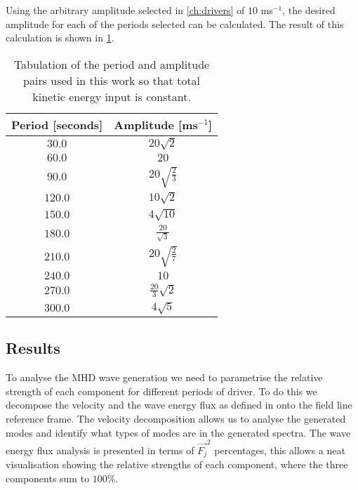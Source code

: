 Using the arbitrary amplitude selected in \cref{ch:drivers} of $10$ ms$^{-1}$, the desired amplitude for each of the periods selected can be calculated.
The result of this calculation is shown in \cref{tab:period-amp}.
\begin{table}
    \centering
    \begin{tabular}{cc}
        Period [seconds] & Amplitude [ms$^{-1}$] 	\\ \hline
        $30.0$           & $20\sqrt{2}$           	\\[2ex]
        $60.0$           & $20$  		            \\[2ex]
        $90.0$           & $20\sqrt{\frac{2}{3}}$  \\[2ex]
        $120.0$          & $10\sqrt{2}$        	\\[2ex]
        $150.0$          & $4\sqrt{10}$            \\[2ex]
        $180.0$          & $\frac{20}{\sqrt{3}}$   \\[2ex]
        $210.0$          & $20\sqrt{\frac{2}{7}}$  \\[2ex]
        $240.0$          & $10$                 	\\[2ex]
        $270.0$          & $\frac{20}{3}\sqrt{2}$  \\[2ex]
        $300.0$          & $4\sqrt{5}$           	\\[2ex]
    \end{tabular}
    \caption{Tabulation of the period and amplitude pairs used in this work so that total kinetic energy input is constant.}
    \label{tab:period-amp}
\end{table}

\subsection{Results}\label{subsec:results}

To analyse the MHD wave generation we need to parametrise the relative strength of each component for different periods of driver.
To do this we decompose the velocity and the wave energy flux as defined in \cite{bogdan2003} onto the field line reference frame.
The velocity decomposition allows us to analyse the generated modes and identify what types of modes are in the generated spectra.
The wave energy flux analysis is presented in terms of $\vec{F_j}^2$ percentages, this allows a neat visualisation showing the relative strengths of each component, where the three components sum to $100\%$.


